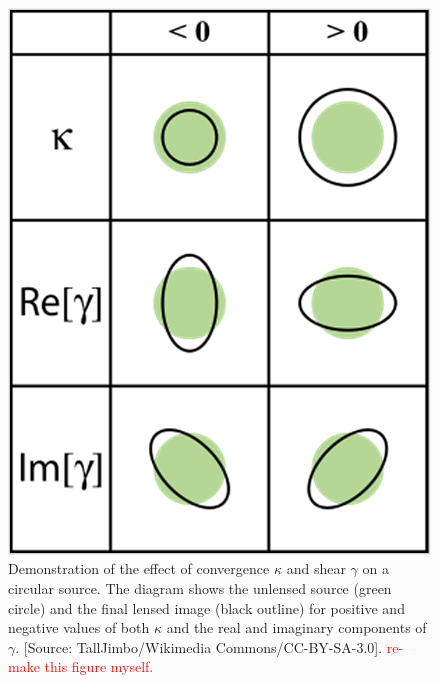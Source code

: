 \begin{figure}
\begin{center}
\includegraphics[scale=0.3]{plots_intro/kappa_gamma.png}
\caption[$\kappa$ and $\gamma$ Diagram]{Demonstration of the effect of convergence $\kappa$ and shear $\gamma$ on a circular source. The diagram shows the unlensed source (green circle) and the final lensed image (black outline) for positive and negative values of both $\kappa$ and the real and imaginary components of $\gamma$. [Source: TallJimbo/Wikimedia Commons/CC-BY-SA-3.0]. \textcolor{red}{re-make this figure myself.}}
\label{plot:kappagamma}
\end{center}
\end{figure}


